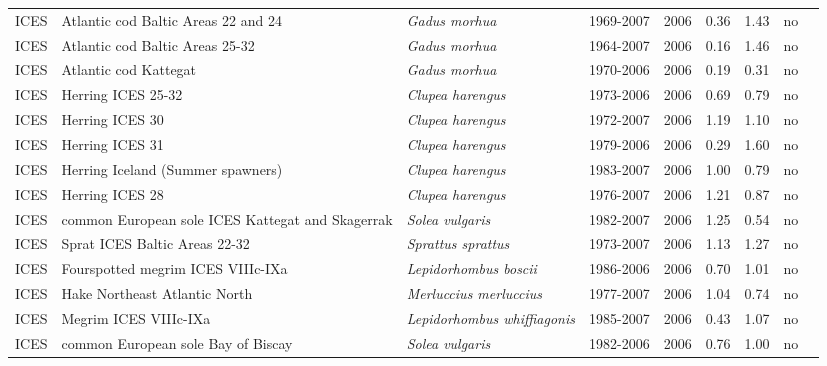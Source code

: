 \begin{longtable}{p{1.8cm}p{4cm}p{4cm}ccccp{1.9cm}c}
  ICES & Atlantic cod Baltic Areas 22 and 24 & \textit{Gadus morhua} & 1969-2007 & 2006 & 0.36 & 1.43 & no & \cite{WGBFAS-CODBA2224-1969-2007-JENNINGS} \\ 
  ICES & Atlantic cod Baltic Areas 25-32 & \textit{Gadus morhua} & 1964-2007 & 2006 & 0.16 & 1.46 & no & \cite{WGBFAS-CODBA2532-1964-2007-JENNINGS} \\ 
  ICES & Atlantic cod Kattegat & \textit{Gadus morhua} & 1970-2006 & 2006 & 0.19 & 0.31 & no & \cite{WGBFAS-CODKAT-1970-2006-MINTO} \\ 
  ICES & Herring ICES 25-32 & \textit{Clupea harengus} & 1973-2006 & 2006 & 0.69 & 0.79 & no & \cite{WGBFAS-HERR2532-1973-2006-JENNINGS} \\ 
  ICES & Herring ICES 30 & \textit{Clupea harengus} & 1972-2007 & 2006 & 1.19 & 1.10 & no & \cite{WGBFAS-HERR30-1972-2007-JENNINGS} \\ 
  ICES & Herring ICES 31 & \textit{Clupea harengus} & 1979-2006 & 2006 & 0.29 & 1.60 & no & \cite{WGBFAS-HERR31-1979-2006-JENNINGS} \\ 
  ICES & Herring Iceland (Summer spawners) & \textit{Clupea harengus} & 1983-2007 & 2006 & 1.00 & 0.79 & no & \cite{WGBFAS-HERRIsum-1983-2007-JENNINGS} \\ 
  ICES & Herring ICES 28 & \textit{Clupea harengus} & 1976-2007 & 2006 & 1.21 & 0.87 & no & \cite{WGBFAS-HERRRIGA-1976-2007-JENNINGS} \\ 
  ICES & common European sole ICES Kattegat and Skagerrak & \textit{Solea vulgaris} & 1982-2007 & 2006 & 1.25 & 0.54 & no & \cite{WGBFAS-SOLEIIIa-1982-2007-JENNINGS} \\ 
  ICES & Sprat ICES Baltic Areas 22-32 & \textit{Sprattus sprattus} & 1973-2007 & 2006 & 1.13 & 1.27 & no & \cite{WGBFAS-SPRAT22-32-1973-2007-JENNINGS} \\ 
  ICES & Fourspotted megrim ICES VIIIc-IXa & \textit{Lepidorhombus boscii} & 1986-2006 & 2006 & 0.70 & 1.01 & no & \cite{WGHMM-FMEG8c9a-1986-2006-JENNINGS} \\ 
  ICES & Hake Northeast Atlantic North & \textit{Merluccius merluccius} & 1977-2007 & 2006 & 1.04 & 0.74 & no & \cite{WGHMM-HAKENRTN-1977-2007-JENNINGS} \\ 
  ICES & Megrim ICES VIIIc-IXa & \textit{Lepidorhombus whiffiagonis} & 1985-2007 & 2006 & 0.43 & 1.07 & no & \cite{WGHMM-MEG8c9a-1985-2007-JENNINGS} \\ 
  ICES & common European sole Bay of Biscay & \textit{Solea vulgaris} & 1982-2006 & 2006 & 0.76 & 1.00 & no & \cite{WGHMM-SOLEVIII-1982-2006-JENNINGS} \\ 

\end{longtable}

